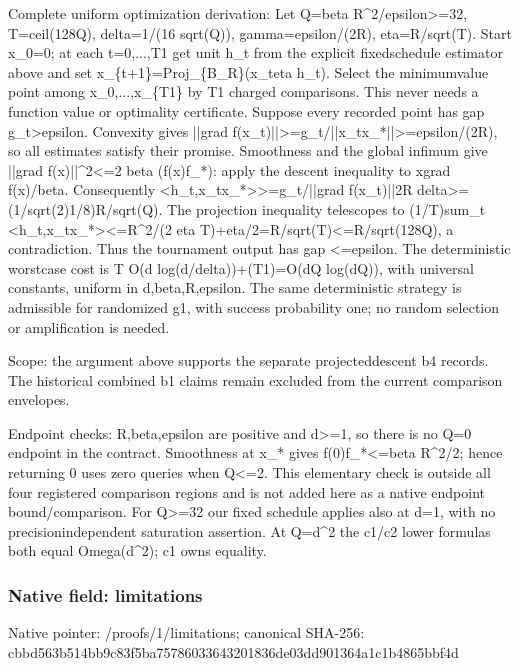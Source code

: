 \documentclass[10pt,a4paper]{article}
\begin{document}
Complete uniform optimization derivation: Let Q=beta R\textasciicircum{}2/epsilon>=32, T=ceil(128Q), delta=1/(16 sqrt(Q)), gamma=epsilon/(2R), eta=R/sqrt(T). Start x\_0=0; at each t=0,...,T1 get unit h\_t from the explicit fixedschedule estimator above and set x\_\{t+1\}=Proj\_\{B\_R\}(x\_teta h\_t). Select the minimumvalue point among x\_0,...,x\_\{T1\} by T1 charged comparisons. This never needs a function value or optimality certificate. Suppose every recorded point has gap g\_t>epsilon. Convexity gives ||grad f(x\_t)||>=g\_t/||x\_tx\_*|\allowbreak{}|>=epsilon/(2R), so all estimates satisfy their promise. Smoothness and the global infimum give ||grad f(x)||\textasciicircum{}2<=2 beta (f(x)f\_*): apply the descent inequality to xgrad f(x)/beta. Consequently <h\_t,x\_tx\_*>>=g\_t/||grad f(x\_t)||2R delta>=(1/sqrt(2)1/8)R/sqrt(Q). The projection inequality telescopes to (1/T)sum\_t <h\_t,x\_tx\_*><=R\textasciicircum{}2/(2 eta T)+eta/2=R/sqrt(T)<=R/sqrt(128Q), a contradiction. Thus the tournament output has gap <=epsilon. The deterministic worstcase cost is T O(d log(d/delta))+(T1)=O(dQ log(dQ)), with universal constants, uniform in d,beta,R,epsilon. The same deterministic strategy is admissible for randomized g1, with success probability one; no random selection or amplification is needed.

Scope: the argument above supports the separate projecteddescent b4 records. The historical combined b1 claims remain excluded from the current comparison envelopes.

Endpoint checks: R,beta,epsilon are positive and d>=1, so there is no Q=0 endpoint in the contract. Smoothness at x\_* gives f(0)f\_*<=beta R\textasciicircum{}2/2; hence returning 0 uses zero queries when Q<=2. This elementary check is outside all four registered comparison regions and is not added here as a native endpoint bound/comparison. For Q>=32 our fixed schedule applies also at d=1, with no precisionindependent saturation assertion. At Q=d\textasciicircum{}2 the c1/c2 lower formulas both equal Omega(d\textasciicircum{}2); c1 owns equality.


\subsubsection{Native field: limitations}


Native pointer: /proofs/1/limitations; canonical SHA-256: cbbd563b514bb9c83f5ba757\allowbreak{}86033643201836de03dd9013\allowbreak{}64a1c1b4865bbf4d
\end{document}
